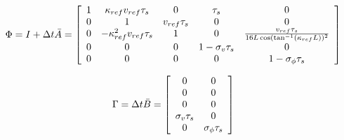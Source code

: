 \begin{equation}
    \Phi 
    =
    I + \Delta t \Bar{A}
    =
    \left[ {\begin{array}{ccccc}
        1 &\kappa_{ref} v_{ref}\tau_s &0 &\tau_s &0 \\
        0 &1 &v_{ref}\tau_s &0 &0\\
        0 &-\kappa_{ref}^2 v_{ref}\tau_s &1 &0 &\frac{v_{ref}\tau_s}{16L \cos(\tan^{-1}(\kappa_{ref} L))^2}\\
        0 &0 &0 &1-\sigma_v \tau_s&0\\
        0 &0 &0 &0 &1-\sigma_{\phi}\tau_s
    \end{array} } \right]
\end{equation}

\begin{equation}
    \Gamma 
    =
    \Delta t \Bar{B}
    =
    \left[ {\begin{array}{cc}
        0 &0\\
        0 &0\\
        0 &0\\
        \sigma_v \tau_s &0\\
        0 &\sigma_{\phi} \tau_s\\
    \end{array} } \right]
\end{equation}


